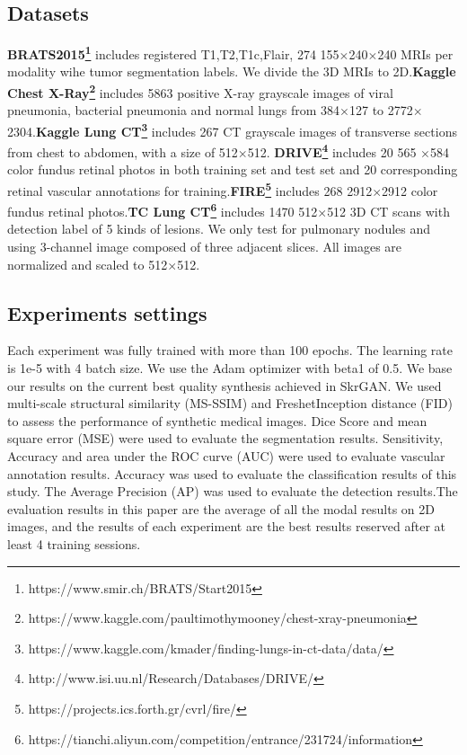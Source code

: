 \documentclass[runningheads]{llncs}
\begin{document}
	\subsection{Datasets}
	\textbf{BRATS2015\footnote{https://www.smir.ch/BRATS/Start2015}} includes registered T1,T2,T1c,Flair, 274 155$\times$240$\times$240 MRIs per modality wihe tumor segmentation labels. We divide the 3D MRIs to 2D.\textbf{Kaggle Chest X-Ray\footnote{https://www.kaggle.com/paultimothymooney/chest-xray-pneumonia }} includes 5863 positive X-ray grayscale images of viral pneumonia, bacterial pneumonia and normal lungs from 384$\times$127 to 2772$\times$2304.\textbf{Kaggle Lung CT\footnote{https://www.kaggle.com/kmader/finding-lungs-in-ct-data/data/}} includes 267  CT grayscale images of transverse sections from chest to abdomen, with a size of 512$\times$512. \textbf{DRIVE\footnote{http://www.isi.uu.nl/Research/Databases/DRIVE/}} includes 20 565 $\times $584 color fundus retinal photos in both training set and test set and 20 corresponding retinal vascular annotations for training.\textbf{FIRE\footnote{https://projects.ics.forth.gr/cvrl/fire/}} includes 268 2912$\times$2912 color fundus retinal photos.\textbf{TC Lung CT\footnote{https://tianchi.aliyun.com/competition/entrance/231724/information}} includes 1470 512$\times$512 3D CT scans with detection label of 5 kinds of lesions. We only test for pulmonary nodules and using 3-channel image composed of three adjacent slices. All images are normalized and scaled to 512$\times$512.
	
	\subsection{Experiments settings}
	Each experiment was fully trained with more than 100 epochs. The learning rate is 1e-5 with 4 batch size. We use the Adam optimizer with beta1 of 0.5.
	We base our results on the current best quality synthesis achieved in SkrGAN\cite{96zhang2019skrgan:}. We used multi-scale structural similarity (MS-SSIM) and FreshetInception distance (FID)\cite{148karras2017progressive} to assess the performance of synthetic medical images. Dice Score\cite {95dice1945measures} and mean square error (MSE) were used to evaluate the segmentation results. Sensitivity, Accuracy and area under the ROC curve (AUC) were used to evaluate vascular annotation results. Accuracy was used to evaluate the classification results of this study. The Average Precision (AP) was used to evaluate the detection results.The evaluation results in this paper are the average of all the modal results on 2D images, and the results of each experiment are the best results reserved after at least 4 training sessions.
	
\end{document}
